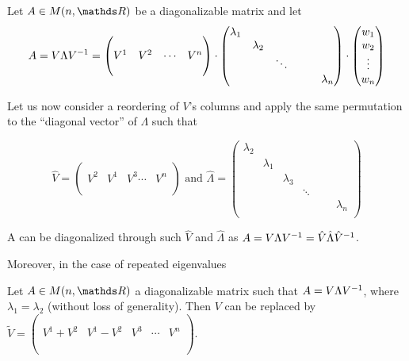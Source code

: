 \documentclass[computationalMathematics.tex]{subfiles}
\begin{document}
\begin{proposition}
  Let $A \in M(n, \R)$ be a diagonalizable matrix and let 
  \[
    A=V\Lambda {V}^{-1} = \begin{pmatrix}
    \\
    V^1 & V^2 & \cdots & V^n\\
    \\
  \end{pmatrix}
  \cdot 
  \begin{pmatrix}
    \lambda_1\\
    &\lambda_2\\
    && \ddots\\
    &&&&&\lambda_n\\
  \end{pmatrix}
  \cdot 
  \begin{pmatrix}
    w_1\\
    w_2\\
    \vdots\\
    w_n\\
  \end{pmatrix}
\]

  Let us now consider a reordering of $V$'s columns and apply the same permutation to the ``diagonal vector'' of $\Lambda$ such that
  
\[
    \hat{V} = \begin{pmatrix}
    \\
    V^2 & V^1 & V^3 \cdots & V^n\\
    \\
  \end{pmatrix}
  \text{ and }
  \hat{\Lambda}= \begin{pmatrix}
    \lambda_2\\
    &\lambda_1\\
    &&\lambda_3\\
    &&& \ddots\\
    &&&&&&\lambda_n\\
  \end{pmatrix}
\]

  A can be diagonalized through such $\hat{V}$ and $\hat{\Lambda}$ as $A = V \Lambda {V}^{-1} = \hat{V} \hat{\Lambda} {\hat{V}}^{-1}$.
\end{proposition}

Moreover, in the case of repeated eigenvalues

\begin{proposition}
  Let $A \in M(n, \R)$ a diagonalizable matrix such that $A = V \Lambda {V}^{-1}$, where $\lambda_1 = \lambda_2$ (without loss of generality). Then $V$ can be replaced by $\widetilde{V} = \begin{pmatrix}
    \\
    \\
    V^1 + V^2 & V^1 - V^2 & V^3 & \cdots & V^n\\
    \\
    \\
  \end{pmatrix}$.
\end{proposition}
\end{document}
